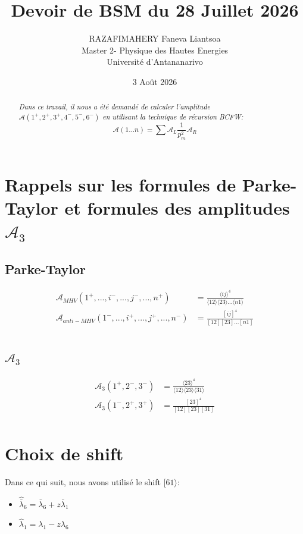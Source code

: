 \documentclass[12pt, a4paper]{article}
\title{Devoir de BSM du 28 Juillet 2026 }
\author{RAZAFIMAHERY Faneva Liantsoa\\ 
	\small{Master 2- Physique des Hautes Energies} \\ \small{Université d'Antananarivo}}
\date{\small 3 Août 2026}
\begin{document}
	\maketitle
	\begin{abstract}
		\textit{Dans ce travail, il nous a été demandé de calculer l'amplitude $\mathcal{A}(1^+, 2^+, 3^+, 4^-, 5^-, 6^-)$ en utilisant la technique de récursion BCFW:}\\
		\[\mathcal{A}(1...n)=\sum \mathcal{A}_L \frac{1}{p^2_m} \mathcal{A}_R\]
	\end{abstract}
		\section*{Rappels sur les formules de Parke-Taylor et formules des amplitudes $\mathcal{A}_3$}
		\subsection*{ \normalsize Parke-Taylor }
		\begin{equation}
		\begin{split}
			 \mathcal{A}_{MHV}(1^+,..., i^-,..., j^-,..., n^+)&=\frac{ \langle ij \rangle ^4}{\langle 12 \rangle \langle 23 \rangle...\langle n1 \rangle}\\
			 \mathcal{A}_{anti-MHV}(1^-,..., i^+,..., j^+,..., n^-)&=\frac{ [ij]^4}{[12] [23]...[n1]}\\
		\end{split}
		\end{equation}
		\subsection*{ \normalsize $\mathcal{A}_3$}
		\begin{equation}
			\begin{split}
				\mathcal{A}_3(1^+, 2^-, 3^-)&=\frac{ \langle 23 \rangle ^4}{\langle 12 \rangle \langle 23 \rangle \langle 31 \rangle }\\
				\mathcal{A}_3(1^-,2^+, 3^+)&=\frac{ [23]^4}{[12] [23][31]}\\
			\end{split}
		\end{equation}
		\section{Choix de shift}
		Dans ce qui suit, nous avons utilisé le shift $[61 \rangle$:
		\begin{itemize}
			\item $ \hat{\bar{\lambda}}_6= \bar{\lambda}_6 + z \bar{\lambda}_1 $
			\item $ \hat{\lambda}_1= \lambda_1 - z \lambda_6 $
		\end{itemize}
		
\end{document}
